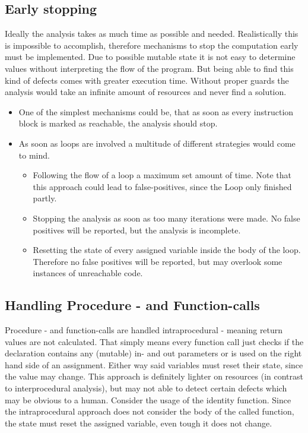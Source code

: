 \subsection{Early stopping}
\label{sub:early stopping}
Ideally the analysis takes as much time as possible and needed. Realistically this is impossible to accomplish, therefore mechanisms to stop the computation early must be implemented.
Due to possible mutable state it is not easy to determine values without interpreting the flow of the program. 
But being able to find this kind of defects comes with greater execution time. Without proper guards the analysis would take an infinite amount of resources and never find a solution.
\begin{itemize}
	\item One of the simplest mechanisms could be, that as soon as every instruction block is marked as reachable, the analysis should stop.
	\item As soon as loops are involved a multitude of different strategies would come to mind. 
	\begin{itemize}
		\item Following the flow of a loop a maximum set amount of time. Note that this approach could lead to false-positives, since the Loop only finished partly. 
		\item Stopping the analysis as soon as too many iterations were made. No false positives will be reported, but the analysis is incomplete.
		\item Resetting the state of every assigned variable inside the body of the loop. Therefore no false positives will be reported, but may overlook some instances of unreachable code.
	\end{itemize}
\end{itemize}

\subsection{Handling Procedure - and Function-calls}
\label{sub:handling procedure and function calls}
Procedure - and function-calls are handled intraprocedural - meaning return values are not calculated. That simply means every function call just checks if the declaration contains any (mutable) in- and out parameters or is used on the right hand side of an assignment.
Either way said variables must reset their state, since the value may change. 
This approach is definitely lighter on resources (in contrast to interprocedural analysis), but may not able to detect certain defects which may be obvious to a human. Consider the usage of the identity function. Since the intraprocedural approach does not consider the body of the called function, the state must reset the assigned variable, even tough it does not change.


